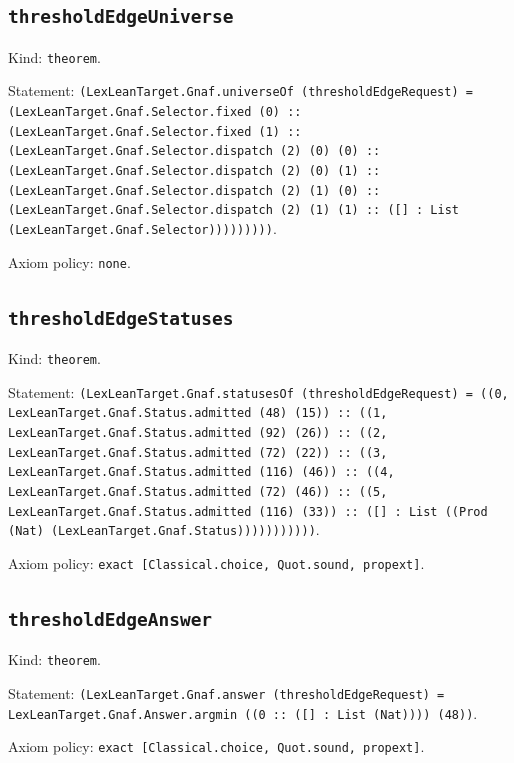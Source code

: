 \documentclass[11pt]{article}
\begin{document}
\subsection*{\texttt{thresholdEdgeUniverse}}
\noindent Kind: \texttt{theorem}.\par
\noindent Statement: \texttt{(LexLeanTarget.Gnaf.universeOf (thresholdEdgeRequest) = (LexLeanTarget.Gnaf.Selector.fixed (0) :: (LexLeanTarget.Gnaf.Selector.fixed (1) :: (LexLeanTarget.Gnaf.Selector.dispatch (2) (0) (0) :: (LexLeanTarget.Gnaf.Selector.dispatch (2) (0) (1) :: (LexLeanTarget.Gnaf.Selector.dispatch (2) (1) (0) :: (LexLeanTarget.Gnaf.Selector.dispatch (2) (1) (1) :: ([] : List (LexLeanTarget.Gnaf.Selector)))))))))}.\par
\noindent Axiom policy: \texttt{none}.\par
\subsection*{\texttt{thresholdEdgeStatuses}}
\noindent Kind: \texttt{theorem}.\par
\noindent Statement: \texttt{(LexLeanTarget.Gnaf.statusesOf (thresholdEdgeRequest) = ((0, LexLeanTarget.Gnaf.Status.admitted (48) (15)) :: ((1, LexLeanTarget.Gnaf.Status.admitted (92) (26)) :: ((2, LexLeanTarget.Gnaf.Status.admitted (72) (22)) :: ((3, LexLeanTarget.Gnaf.Status.admitted (116) (46)) :: ((4, LexLeanTarget.Gnaf.Status.admitted (72) (46)) :: ((5, LexLeanTarget.Gnaf.Status.admitted (116) (33)) :: ([] : List ((Prod (Nat) (LexLeanTarget.Gnaf.Status)))))))))))}.\par
\noindent Axiom policy: \texttt{exact [Classical.choice, Quot.sound, propext]}.\par
\subsection*{\texttt{thresholdEdgeAnswer}}
\noindent Kind: \texttt{theorem}.\par
\noindent Statement: \texttt{(LexLeanTarget.Gnaf.answer (thresholdEdgeRequest) = LexLeanTarget.Gnaf.Answer.argmin ((0 :: ([] : List (Nat)))) (48))}.\par
\noindent Axiom policy: \texttt{exact [Classical.choice, Quot.sound, propext]}.\par
\end{document}
